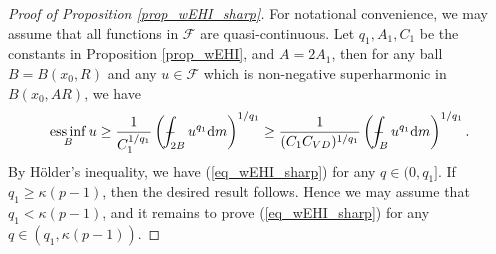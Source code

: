 \documentclass[11pt,a4paper]{article}
\numberwithin{equation}{section}
\newcommand{\einf}{\operatorname*{ess\,inf}}
\def\Xint#1{\mathchoice
{\XXint\displaystyle\textstyle{#1}}%
{\XXint\textstyle\scriptstyle{#1}}%
{\XXint\scriptstyle\scriptscriptstyle{#1}}%
{\XXint\scriptscriptstyle\scriptscriptstyle{#1}}%
\!\int}
\def\XXint#1#2#3{{\setbox0=\hbox{$#1{#2#3}{\int}$ }
\vcenter{\hbox{$#2#3$ }}\kern-.6\wd0}}
\def\dashint{\Xint-}
\theoremstyle{plain}
\theoremstyle{definition}
\begin{document}
\begin{proof}[Proof of Proposition \ref{prop_wEHI_sharp}]
For notational convenience, we may assume that all functions in $\mathcal{F}$ are quasi-continuous. Let $q_1,A_1,C_1$ be the constants in Proposition \ref{prop_wEHI}, and $A=2A_1$, then for any ball $B=B(x_0,R)$ and any $u\in \mathcal{F}$ which is non-negative superharmonic in $B(x_0,AR)$, we have
\begin{equation*}
\einf_{B}u\ge \frac{1}{C_1^{1/q_1}}\left(\dashint_{2B}u^{q_1} \mathrm{d}m\right)^{1/q_1}\ge\frac{1}{(C_1C_{VD})^{1/{q_1}}}\left(\dashint_{B}u^{q_1} \mathrm{d}m\right)^{1/q_1}.
\end{equation*}
By H\"older's inequality, we have (\ref{eq_wEHI_sharp}) for any $q\in(0,q_1]$. If $q_1\ge\kappa(p-1)$, then the desired result follows. Hence we may assume that $q_1<\kappa(p-1)$, and it remains to prove (\ref{eq_wEHI_sharp}) for any $q\in(q_1,\kappa(p-1))$.


\end{proof}
\end{document}
